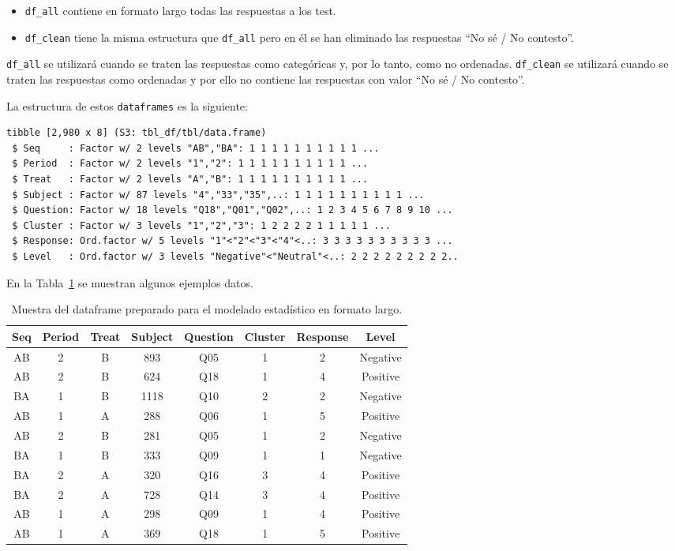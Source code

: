 \documentclass[
  12pt,
  a4paper,
  extrafontsizes,
  onecolumn,
  openright]{memoir}
\providecommand{\tightlist}{%
  \setlength{\itemsep}{0pt}\setlength{\parskip}{0pt}}\usepackage{longtable,booktabs,array}
\begin{document}
\begin{itemize}
\tightlist
\item
  \texttt{df\_all} contiene en formato largo todas las respuestas a los
  test.
\item
  \texttt{df\_clean} tiene la misma estructura que \texttt{df\_all} pero
  en él se han eliminado las respuestas \enquote{No sé / No contesto}.
\end{itemize}

\texttt{df\_all} se utilizará cuando se traten las respuestas como
categóricas y, por lo tanto, como no ordenadas. \texttt{df\_clean} se
utilizará cuando se traten las respuestas como ordenadas y por ello no
contiene las respuestas con valor \enquote{No sé / No contesto}.

La estructura de estos \texttt{dataframes} es la siguiente:

\begin{verbatim}
tibble [2,980 x 8] (S3: tbl_df/tbl/data.frame)
 $ Seq     : Factor w/ 2 levels "AB","BA": 1 1 1 1 1 1 1 1 1 1 ...
 $ Period  : Factor w/ 2 levels "1","2": 1 1 1 1 1 1 1 1 1 1 ...
 $ Treat   : Factor w/ 2 levels "A","B": 1 1 1 1 1 1 1 1 1 1 ...
 $ Subject : Factor w/ 87 levels "4","33","35",..: 1 1 1 1 1 1 1 1 1 1 ...
 $ Question: Factor w/ 18 levels "Q18","Q01","Q02",..: 1 2 3 4 5 6 7 8 9 10 ...
 $ Cluster : Factor w/ 3 levels "1","2","3": 1 2 2 2 2 1 1 1 1 1 ...
 $ Response: Ord.factor w/ 5 levels "1"<"2"<"3"<"4"<..: 3 3 3 3 3 3 3 3 3 3 ...
 $ Level   : Ord.factor w/ 3 levels "Negative"<"Neutral"<..: 2 2 2 2 2 2 2 2 2..
\end{verbatim}

En la Tabla~\ref{tbl-df_clean} se muestran algunos ejemplos datos.

\hypertarget{tbl-df_clean}{}
\begin{longtable}{cccccccc}
\caption{\label{tbl-df_clean}Muestra del dataframe preparado para el modelado estadístico en formato
largo. }\tabularnewline

\toprule
Seq & Period & Treat & Subject & Question & Cluster & Response & Level \\ 
\midrule
AB & 2 & B & 893 & Q05 & 1 & 2 & Negative \\ 
AB & 2 & B & 624 & Q18 & 1 & 4 & Positive \\ 
BA & 1 & B & 1118 & Q10 & 2 & 2 & Negative \\ 
AB & 1 & A & 288 & Q06 & 1 & 5 & Positive \\ 
AB & 2 & B & 281 & Q05 & 1 & 2 & Negative \\ 
BA & 1 & B & 333 & Q09 & 1 & 1 & Negative \\ 
BA & 2 & A & 320 & Q16 & 3 & 4 & Positive \\ 
BA & 2 & A & 728 & Q14 & 3 & 4 & Positive \\ 
AB & 1 & A & 298 & Q09 & 1 & 4 & Positive \\ 
AB & 1 & A & 369 & Q18 & 1 & 5 & Positive \\ 
\bottomrule
\end{longtable}
\end{document}
